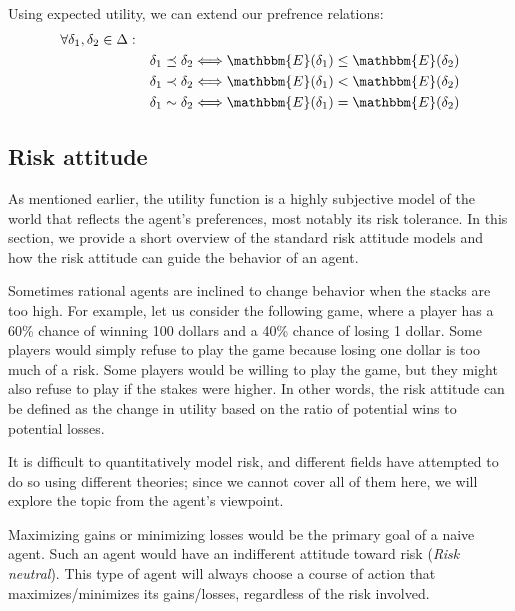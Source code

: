 Using expected utility, we can extend our prefrence relations:
\vspace{-0.5em}
\begin{subequations}
    \begin{align*}
    \forall \delta_1, \delta_2 \in \Delta: \quad& \\
    & \delta_1 \preceq \delta_2 \Longleftrightarrow \mathbbm{E}(\delta_1) \leq \mathbbm{E}(\delta_2) \\
    & \delta_1 \prec \delta_2 \Longleftrightarrow \mathbbm{E}(\delta_1) < \mathbbm{E}(\delta_2) \\
    & \delta_1 \sim \delta_2 \Longleftrightarrow \mathbbm{E}(\delta_1) = \mathbbm{E}(\delta_2) \\
    \end{align*}
\end{subequations}

\subsection{Risk attitude}
As mentioned earlier, the utility function is a highly subjective model of the world that reflects the agent's preferences, most notably its risk tolerance. In this section, we provide a short overview of the standard risk attitude models and how the risk attitude can guide the behavior of an agent.

Sometimes rational agents are inclined to change behavior when the stacks are too high. For example, let us consider the following game, where a player has a 60\% chance of winning 100 dollars and a 40\% chance of losing 1 dollar. Some players would simply refuse to play the game because losing one dollar is too much of a risk. Some players would be willing to play the game, but they might also refuse to play if the stakes were higher. In other words, the risk attitude can be defined as the change in utility based on the ratio of potential wins to potential losses.

It is difficult to quantitatively model risk, and different fields have attempted to do so using different theories; since we cannot cover all of them here, we will explore the topic from the agent's viewpoint.

Maximizing gains or minimizing losses would be the primary goal of a naive agent. Such an agent would have an indifferent attitude toward risk (\textit{Risk neutral}). This type of agent will always choose a course of action that maximizes/minimizes its gains/losses, regardless of the risk involved.

